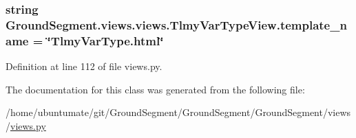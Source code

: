 \subsubsection[{template\+\_\+name}]{\setlength{\rightskip}{0pt plus 5cm}string Ground\+Segment.\+views.\+views.\+Tlmy\+Var\+Type\+View.\+template\+\_\+name = \char`\"{}Tlmy\+Var\+Type.\+html\char`\"{}\hspace{0.3cm}{\ttfamily [static]}}\label{class_ground_segment_1_1views_1_1views_1_1_tlmy_var_type_view_a92cf3128522367cfafc07cc0bc62dc93}


Definition at line 112 of file views.\+py.



The documentation for this class was generated from the following file\+:\begin{DoxyCompactItemize}
\item 
/home/ubuntumate/git/\+Ground\+Segment/\+Ground\+Segment/\+Ground\+Segment/views/\hyperlink{views_8py}{views.\+py}\end{DoxyCompactItemize}
